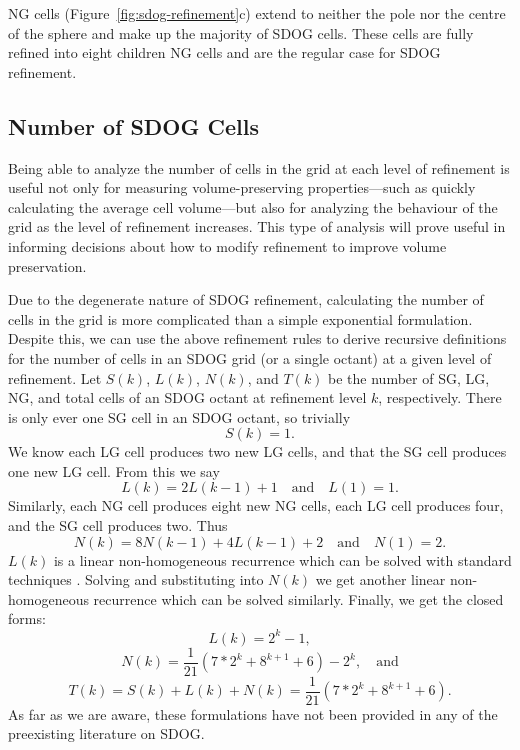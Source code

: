 NG cells (Figure~\ref{fig:sdog-refinement}c) extend to neither the pole nor the centre of the sphere and make up the majority of SDOG cells.
These cells are fully refined into eight children NG cells and are the regular case for SDOG refinement.


\subsection{Number of SDOG Cells} \label{chap:4:numCells}
Being able to analyze the number of cells in the grid at each level of refinement is useful not only for measuring volume-preserving properties---such as quickly calculating the average cell volume---but also for analyzing the behaviour of the grid as the level of refinement increases.
This type of analysis will prove useful in informing decisions about how to modify refinement to improve volume preservation.


Due to the degenerate nature of SDOG refinement, calculating the number of cells in the grid is more complicated than a simple exponential formulation.
Despite this, we can use the above refinement rules to derive recursive definitions for the number of cells in an SDOG grid (or a single octant) at a given level of refinement.
Let $S(k)$, $L(k)$, $N(k)$, and $T(k)$ be the number of SG, LG, NG, and total cells of an SDOG octant at refinement level $k$, respectively.
There is only ever one SG cell in an SDOG octant, so trivially
%
\begin{equation*}
S(k) = 1.
\end{equation*}
%
We know each LG cell produces two new LG cells, and that the SG cell produces one new LG cell.
From this we say
%
\begin{equation*}
L(k) = 2L(k-1) + 1 \quad\text{and}\quad L(1) = 1.
\end{equation*}
%
Similarly, each NG cell produces eight new NG cells, each LG cell produces four, and the SG cell produces two.
Thus
%
\begin{equation*}
N(k) = 8N(k-1) + 4L(k-1) + 2 \quad\text{and}\quad N(1) = 2.
\end{equation*}
%
$L(k)$ is a linear non-homogeneous recurrence which can be solved with standard techniques \cite{bellman1963differential}.
Solving and substituting into $N(k)$ we get another linear non-homogeneous recurrence which can be solved similarly.
Finally, we get the closed forms:
%
\begin{equation*}
L(k) = 2^{k} - 1,
\end{equation*}
%
\begin{equation*}
N(k) = \frac{1}{21} \left( 7*2^{k} + 8^{k+1} + 6 \right) - 2^{k}, \quad\text{and}
\end{equation*}
%
\begin{equation*}
T(k) = S(k) + L(k) + N(k) = \frac{1}{21} \left( 7*2^{k} + 8^{k+1} + 6 \right).
\end{equation*}
%
As far as we are aware, these formulations have not been provided in any of the preexisting literature on SDOG.


